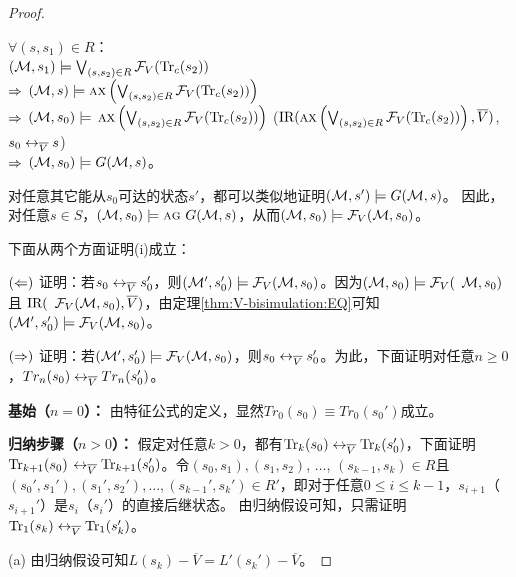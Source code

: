 \begin{proof}
\begin{itemize}
		$\forall (s, s_1) \in R$：\\
		$({\cal M}, s_1) \models \bigvee_{(s, s_2)\in R}{\cal F}_V(\textrm{Tr}_c(s_2))$\\
		$\Rightarrow$ $({\cal M}, s) \models \textsc{a} \textsc{x} \left( \bigvee_{(s, s_2)\in R} {\cal F}_V(\textrm{Tr}_c(s_2)) \right)$ \\
		$\Rightarrow$ $({\cal M}, s_0) \models$  $\textsc{a} \textsc{x} \left( \bigvee_{(s, s_2)\in R} {\cal F}_V(\textrm{Tr}_c(s_2)) \right)$   \hfill  ($\textrm{IR}(\textsc{a} \textsc{x} \left( \bigvee_{(s, s_2)\in R} {\cal F}_V(\textrm{Tr}_c(s_2)) \right), \overline V)$, $s_0 \leftrightarrow_{\overline V} s$)\\
		$\Rightarrow$ $({\cal M}, s_0) \models G({\cal M}, s)$。\\
	\end{itemize}
	
	对任意其它能从$s_0$可达的状态$s'$，都可以类似地证明$({\cal M},s')\models G({\cal M}, s)$。
	因此，对任意$s\in S$，$({\cal M}, s_0) \models \textsc{a}\textsc{g}\ G({\cal M}, s)$，从而$({\cal M}, s_0) \models {\cal F}_V({\cal M}, s_0)$。
	
	下面从两个方面证明(i)成立：
	
	$(\Leftarrow)$ 证明：若$s_0 \leftrightarrow_{\overline V} s_0'$，则$({\cal M}',s_0') \models {\cal F}_V({\cal M},s_0)$。因为$({\cal M}, s_0) \models {\cal F}_V($ ${\cal M}, s_0)$且 $\textrm{IR}($ ${\cal F}_V({\cal M}, s_0), \overline V)$，由定理\ref{thm:V-bisimulation:EQ}可知
	$({\cal M}',s_0') \models {\cal F}_V({\cal M},s_0)$。
	
	$(\Rightarrow)$ 证明：若$({\cal M}',s_0') \models {\cal F}_V({\cal M},s_0)$，则$s_0 \leftrightarrow_{\overline V} s_0'$。为此，下面证明对任意$n \geq 0$，$Tr_n(s_0) \leftrightarrow_{\overline V} Tr_n(s_0')$。
	
	
	\textbf{基始（$n=0$）：} 由特征公式的定义，显然$Tr_0(s_0) \equiv Tr_0(s_0')$成立。
	
	\textbf{归纳步骤（$n>0$）：} 假定对任意$k > 0$，都有$\textrm{Tr}_k(s_0) \leftrightarrow_{\overline V} \textrm{Tr}_k(s_0')$，下面证明$\textrm{Tr}_{k+1}(s_0)$ $\leftrightarrow_{\overline V} \textrm{Tr}_{k+1}(s_0')$。令$(s_0, s_1), (s_1, s_2)$, $\dots$, $(s_{k-1}, s_k) \in R$且$(s_0', s_1'), (s_1', s_2'), \dots, (s_{k-1}', s_k') \in R'$，即对于任意$0 \leq i \leq k-1$，$s_{i+1}$（$s_{i+1}'$）是$s_i$（$s_i'$）的直接后继状态。
	由归纳假设可知，只需证明$\textrm{Tr}_1(s_k) \leftrightarrow_{\overline V} \textrm{Tr}_1(s_k')$。
	
	(a) 由归纳假设可知$L(s_k) - \overline V = L'(s_k') - \overline V$。
	

\end{proof}
